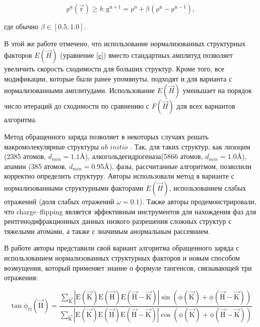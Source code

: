  
\begin{equation}\label{ccf2}
	\mathrm{\rho^n(\overrightarrow{r}) \geq \delta: g^{n+1} = \rho^n + \beta(\rho^n-\rho^{n-1})},
\end{equation} 
  
где обычно $\beta\in[0.5,1.0]$.

В этой же работе отмечено, что использование нормализованных структурных факторов $E(\overrightarrow{H})$ (уравнение \ref{e}) вместо стандартных амплитуд позволяет увеличить скорость сходимости для больших структур. Кроме того, все модификации, которые были ранее упомянуты, подходят и для варианта с нормализованными амплитудами. Использование $E(\overrightarrow{H})$ уменьшает на порядок число итераций до сходимости по сравнению с $F(\overrightarrow{H})$ для всех вариантов алгоритма.

Метод обращенного заряда позволяет в некоторых случаях решать макромолекулярные структуры $ab$ $initio$ \cite{dumas_macromolecular_2008}. Так, для таких структур, как лизоцим (2385 атомов, $d_{min} = 1.1 \text{\AA}$), алкогольдегидрогеназа(5866 атомов, $d_{min} = 1.0 \text{\AA}$), апамин (385 атомов, $d_{min} = 0.95 \text{\AA}$), фазы, рассчитанные алгоритмом, позволили корректно определить структуру. Авторы использовали метод в варианте с нормализованными структурными факторами $E(\overrightarrow{H})$, использованием слабых отражений (доля слабых отражений $\omega = 0.1$). Также авторы продемонстрировали, что charge--flipping является эффективным инструментов для нахождения фаз для рентгенодифракционных данных низкого разрешения сложных структур с тяжелыми атомами, а также с значимым анормальным рассеянием.

В работе \cite{coelho_charge-flipping_2007} авторы представили свой вариант алгоритма обращенного заряда с использованием нормализованных структурных факторов и новым способом возмущения, который применяет знание о формуле тангенсов, связывающей три отражения:

\begin{equation}\label{sigma3}
	\mathrm{\tan\phi_{tf}(\overrightarrow{H}) = \frac{\sum\limits_{\overrightarrow{K}}|E(\overrightarrow{K})E(\overrightarrow{H})E(\overrightarrow{H}-\overrightarrow{K})|\sin(\phi(\overrightarrow{K})+\phi(\overrightarrow{H}-\overrightarrow{K}))}{\sum\limits_{\overrightarrow{K}}|E(\overrightarrow{K})E(\overrightarrow{H})E(\overrightarrow{H}-\overrightarrow{K})|\cos(\phi(\overrightarrow{K})+\phi(\overrightarrow{H}-\overrightarrow{K}))}
	}
\end{equation}

